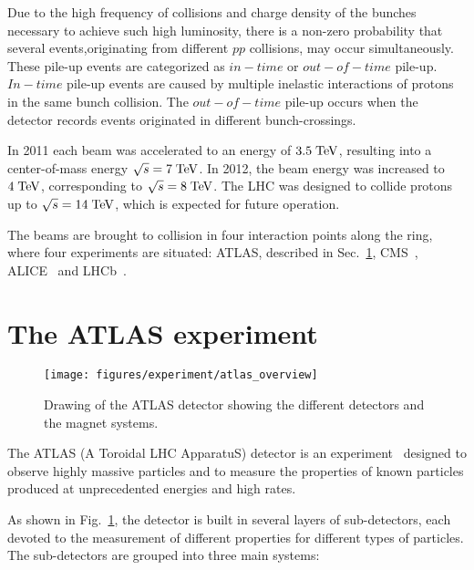 Due to the high frequency of collisions and charge density of the bunches necessary 
to achieve such high luminosity, there is a non-zero probability 
that several events,originating from different $pp$ collisions, 
may occur simultaneously. 
These pile-up events are categorized as $in-time$ or $out-of-time$ pile-up. 
$In-time$ pile-up events are caused by  multiple inelastic interactions of protons 
in the same bunch collision. 
The $out-of-time$ pile-up occurs when the detector records events originated 
in different bunch-crossings.

In 2011 each beam was accelerated to an energy of \mbox{$3.5 \; \mathrm{TeV}$}, 
resulting into a center-of-mass energy \mbox{$\sqrt{s} = 7 \; \mathrm{TeV}$}.
In 2012, the beam energy was increased to \mbox{$4 \; \mathrm{TeV}$}, 
corresponding to \mbox{$\sqrt{s} = 8 \; \mathrm{TeV}$}.
The LHC was designed to collide protons up to \mbox{$\sqrt{s} = 14 \; \mathrm{TeV}$},
which is expected for future operation.

The beams are brought to collision in four interaction points along
the ring, where four experiments are situated: 
ATLAS, described in Sec.~\ref{sec:ATLAS}, CMS~\cite{cms}, ALICE~\cite{alice} and LHCb~\cite{lhcb}.

\section{The ATLAS experiment}
\label{sec:ATLAS}

\begin{figure}[ht]
\begin{center}
\texttt{[image: figures/experiment/atlas\_overview]}
\caption[Drawing of the ATLAS detector]{
  Drawing of the ATLAS detector showing the different detectors and the magnet systems.}
\label{fig:ATLAS}
\end{center}
\end{figure}

The ATLAS (A Toroidal LHC ApparatuS) detector
is an experiment~\cite{detectorpaper} designed to observe highly massive
particles and to measure the properties of known particles produced at
unprecedented energies and high rates. 

As shown in Fig.~\ref{fig:ATLAS}, the detector is built in
several layers of sub-detectors, each devoted to the measurement of
different properties for different types of particles.
The sub-detectors are grouped into three main systems:

